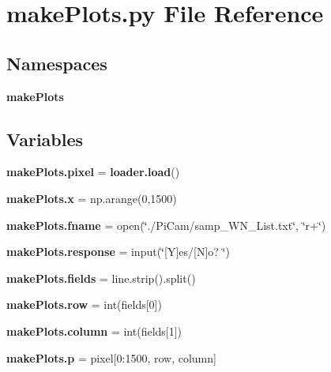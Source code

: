 \section{make\+Plots.\+py File Reference}
\label{make_plots_8py}
\subsection*{Namespaces}
\begin{DoxyCompactItemize}
\item 
 \textbf{ make\+Plots}
\end{DoxyCompactItemize}
\subsection*{Variables}
\begin{DoxyCompactItemize}
\item 
\textbf{ make\+Plots.\+pixel} = \textbf{ loader.\+load}()
\item 
\textbf{ make\+Plots.\+x} = np.\+arange(0,1500)
\item 
\textbf{ make\+Plots.\+fname} = open(\char`\"{}./Pi\+Cam/samp\+\_\+\+W\+N\+\_\+\+List.\+txt\char`\"{}, \char`\"{}r+\char`\"{})
\item 
\textbf{ make\+Plots.\+response} = input(\char`\"{}[Y]es/[N]o? \char`\"{})
\item 
\textbf{ make\+Plots.\+fields} = line.\+strip().split()
\item 
\textbf{ make\+Plots.\+row} = int(fields[0])
\item 
\textbf{ make\+Plots.\+column} = int(fields[1])
\item 
\textbf{ make\+Plots.\+p} = pixel[0\+:1500, row, column]
\end{DoxyCompactItemize}
